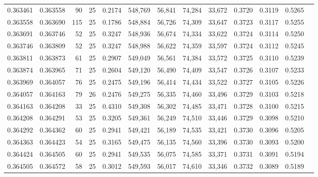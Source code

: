 \begin{tabular}{rrrrrrrrrrrrr}
0.363461 & 0.363558 &    90 &  25 &                                     0.2174 & 548,769 &  56,841 &  74,284 &  33,672 & 0.3720 & 0.3119 & 0.5265 \\
0.363558 & 0.363690 &   115 &  25 &                                     0.1786 & 548,884 &  56,726 &  74,309 &  33,647 & 0.3723 & 0.3117 & 0.5255 \\
0.363691 & 0.363746 &    52 &  25 &                                     0.3247 & 548,936 &  56,674 &  74,334 &  33,622 & 0.3724 & 0.3114 & 0.5250 \\
0.363746 & 0.363809 &    52 &  25 &                                     0.3247 & 548,988 &  56,622 &  74,359 &  33,597 & 0.3724 & 0.3112 & 0.5245 \\
0.363811 & 0.363873 &    61 &  25 &                                     0.2907 & 549,049 &  56,561 &  74,384 &  33,572 & 0.3725 & 0.3110 & 0.5239 \\
0.363874 & 0.363965 &    71 &  25 &                                     0.2604 & 549,120 &  56,490 &  74,409 &  33,547 & 0.3726 & 0.3107 & 0.5233 \\
0.363969 & 0.364057 &    76 &  25 &                                     0.2475 & 549,196 &  56,414 &  74,434 &  33,522 & 0.3727 & 0.3105 & 0.5226 \\
0.364057 & 0.364163 &    79 &  26 &                                     0.2476 & 549,275 &  56,335 &  74,460 &  33,496 & 0.3729 & 0.3103 & 0.5218 \\
0.364163 & 0.364208 &    33 &  25 &                                     0.4310 & 549,308 &  56,302 &  74,485 &  33,471 & 0.3728 & 0.3100 & 0.5215 \\
0.364208 & 0.364291 &    53 &  25 &                                     0.3205 & 549,361 &  56,249 &  74,510 &  33,446 & 0.3729 & 0.3098 & 0.5210 \\
0.364292 & 0.364362 &    60 &  25 &                                     0.2941 & 549,421 &  56,189 &  74,535 &  33,421 & 0.3730 & 0.3096 & 0.5205 \\
0.364363 & 0.364423 &    54 &  25 &                                     0.3165 & 549,475 &  56,135 &  74,560 &  33,396 & 0.3730 & 0.3093 & 0.5200 \\
0.364424 & 0.364505 &    60 &  25 &                                     0.2941 & 549,535 &  56,075 &  74,585 &  33,371 & 0.3731 & 0.3091 & 0.5194 \\
0.364505 & 0.364572 &    58 &  25 &                                     0.3012 & 549,593 &  56,017 &  74,610 &  33,346 & 0.3732 & 0.3089 & 0.5189 \\

\end{tabular}
